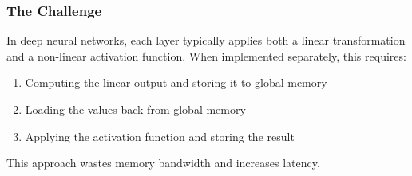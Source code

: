 \subsubsection{The Challenge}

In deep neural networks, each layer typically applies both a linear transformation and a non-linear activation function. When implemented separately, this requires:
\begin{enumerate}
    \item Computing the linear output and storing it to global memory
    \item Loading the values back from global memory
    \item Applying the activation function and storing the result
\end{enumerate}

This approach wastes memory bandwidth and increases latency.

